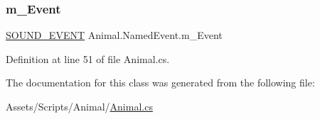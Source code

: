 \subsubsection{\texorpdfstring{m\+\_\+\+Event}{m\_Event}}
{\footnotesize\ttfamily \mbox{\hyperlink{class_animal_aa498775210af23df33eb0095e81ecbf7}{S\+O\+U\+N\+D\+\_\+\+E\+V\+E\+NT}} Animal.\+Named\+Event.\+m\+\_\+\+Event}



Definition at line 51 of file Animal.\+cs.



The documentation for this class was generated from the following file\+:\begin{DoxyCompactItemize}
\item 
Assets/\+Scripts/\+Animal/\mbox{\hyperlink{_animal_8cs}{Animal.\+cs}}\end{DoxyCompactItemize}
